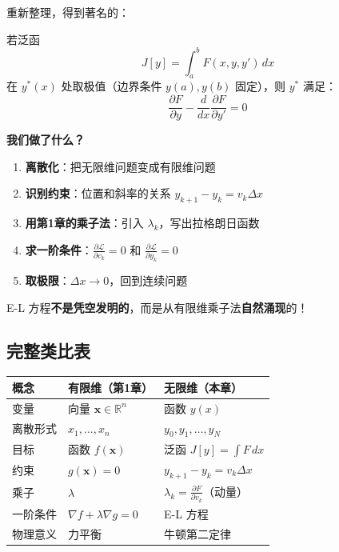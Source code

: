 重新整理，得到著名的：

\begin{keytheorem}[title=Euler-Lagrange 方程]
若泛函
\[
J[y] = \int_a^b F(x, y, y') \, dx
\]
在 $y^*(x)$ 处取极值（边界条件 $y(a), y(b)$ 固定），则 $y^*$ 满足：
\begin{equation}
\boxed{\frac{\partial F}{\partial y} - \frac{d}{dx}\frac{\partial F}{\partial y'} = 0}
\end{equation}
\end{keytheorem}

\begin{insightbox}
\textbf{我们做了什么？}

\begin{enumerate}
    \item \textbf{离散化}：把无限维问题变成有限维问题
    \item \textbf{识别约束}：位置和斜率的关系 $y_{k+1} - y_k = v_k \Delta x$
    \item \textbf{用第1章的乘子法}：引入 $\lambda_k$，写出拉格朗日函数
    \item \textbf{求一阶条件}：$\frac{\partial \mathcal{L}}{\partial v_k} = 0$ 和 $\frac{\partial \mathcal{L}}{\partial y_k} = 0$
    \item \textbf{取极限}：$\Delta x \to 0$，回到连续问题
\end{enumerate}

E-L 方程\textbf{不是凭空发明的}，而是从有限维乘子法\textbf{自然涌现}的！
\end{insightbox}

\subsection{完整类比表}

\begin{center}
\renewcommand{\arraystretch}{1.5}
\begin{tabular}{lll}
\toprule
\textbf{概念} & \textbf{有限维（第1章）} & \textbf{无限维（本章）} \\
\midrule
变量 & 向量 $\mathbf{x} \in \mathbb{R}^n$ & 函数 $y(x)$ \\
离散形式 & $x_1, \ldots, x_n$ & $y_0, y_1, \ldots, y_N$ \\
目标 & 函数 $f(\mathbf{x})$ & 泛函 $J[y] = \int F \, dx$ \\
约束 & $g(\mathbf{x}) = 0$ & $y_{k+1} - y_k = v_k \Delta x$ \\
乘子 & $\lambda$ & $\lambda_k = \frac{\partial F}{\partial v_k}$（动量） \\
一阶条件 & $\nabla f + \lambda \nabla g = 0$ & E-L 方程 \\
物理意义 & 力平衡 & 牛顿第二定律 \\
\bottomrule
\end{tabular}
\end{center}

